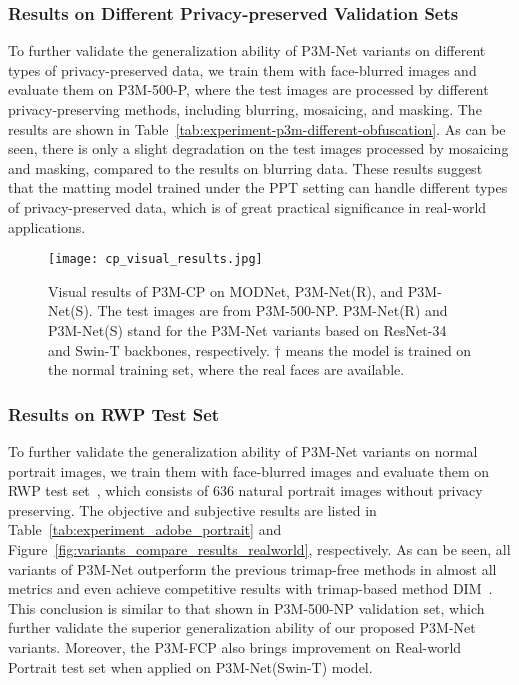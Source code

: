 \documentclass[twocolumn]{svjour3}
\begin{document}
\subsubsection{Results on Different Privacy-preserved Validation Sets}
To further validate the generalization ability of P3M-Net variants on different types of privacy-preserved data, we train them with face-blurred images and evaluate them on P3M-500-P, where
the test images are processed by different privacy-preserving
methods, including blurring, mosaicing, and masking. The results are shown in Table~\ref{tab:experiment-p3m-different-obfuscation}. As can be seen, there is only a slight degradation on the test images processed by mosaicing and masking, compared to the results on blurring data. These results suggest that the matting model trained under the PPT setting can handle different types of privacy-preserved data, which is of great practical significance in real-world applications.



\begin{figure*}[hbtp]
    \centering
    \texttt{[image: cp\_visual\_results.jpg]}
    \caption{Visual results of P3M-CP on MODNet, P3M-Net(R), and P3M-Net(S). The test images are from P3M-500-NP. P3M-Net(R) and P3M-Net(S) stand for the P3M-Net variants based on ResNet-34 and Swin-T backbones, respectively. $\dag$ means the model is trained on the normal training set, where the real faces are available.}
    \label{fig:cp-results}
\end{figure*}



\subsubsection{Results on RWP Test Set}
To further validate the generalization ability of P3M-Net variants on normal portrait images, we train them with face-blurred images and evaluate them on RWP test set~\citep{yu2021mask}, which consists of 636 natural portrait images without privacy preserving. The objective and subjective results are listed in Table~\ref{tab:experiment_adobe_portrait} and Figure~\ref{fig:variants_compare_results_realworld}, respectively. As can be seen, all variants of P3M-Net outperform the previous trimap-free methods in almost all metrics and even achieve competitive results with trimap-based method DIM~\citep{dim}. This conclusion is similar to that shown in P3M-500-NP validation set, which further validate the superior generalization ability of our proposed P3M-Net variants. Moreover, the P3M-FCP also brings improvement on Real-world Portrait test set when applied on P3M-Net(Swin-T) model.
\end{document}
